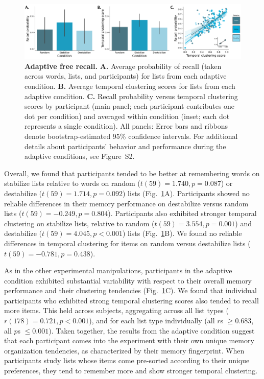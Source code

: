 \documentclass[11pt]{article}
\newcommand{\dynamicsAdaptive}{S2}
\begin{document}
\begin{figure} 
    \centering

    \includegraphics[width=\textwidth]{figures/adaptive_results}
        
        \caption{\textbf{Adaptive free recall.} \textbf{A.} Average probability
        of recall (taken across words, lists, and participants) for lists from
        each adaptive condition. \textbf{B.} Average temporal clustering scores
        for lists from each adaptive condition. \textbf{C.} Recall probability
        versus temporal clustering scores by participant (main panel; each
        participant contributes one dot per condition) and averaged within
        condition (inset; each dot represents a single condition). All panels:
        Error bars and ribbons denote bootstrap-estimated 95\% confidence
        intervals. For additional details about participants' behavior and
        performance during the adaptive conditions, see
        Figure~\dynamicsAdaptive.}

    \label{fig:adaptive}
\end{figure}

Overall, we found that participants tended to be better at remembering words on
stabilize lists relative to words on random ($t(59) = 1.740, p = 0.087$) or
destabilize ($t(59) = 1.714, p = 0.092$) lists (Fig.~\ref{fig:adaptive}A).
Participants showed no reliable differences in their memory performance on
destabilize versus random lists ($t(59) = -0.249, p = 0.804$). Participants
also exhibited stronger temporal clustering on stabilize lists, relative to
random ($t(59) = 3.554, p = 0.001$) and destabilize ($t(59) = 4.045, p <
0.001$) lists (Fig.~\ref{fig:adaptive}B). We found no reliable differences in
temporal clustering for items on random versus destabilize lists ($t(59) =
-0.781, p = 0.438$).

As in the other experimental manipulations, participants in the adaptive
condition exhibited substantial variability with respect to their overall
memory performance and their clustering tendencies (Fig.~\ref{fig:adaptive}C).
We found that individual participants who exhibited strong temporal clustering
scores also tended to recall more items. This held across subjects, aggregating
across all list types ($r(178) = 0.721, p < 0.001$), and for each list type
individually (all $r$s $\geq 0.683$, all $p$s $\leq 0.001$). Taken together,
the results from the adaptive condition suggest that each participant comes
into the experiment with their own unique memory organization tendencies, as
characterized by their memory fingerprint. When participants study lists whose
items come pre-sorted according to their unique preferences, they tend to remember
more and show stronger temporal clustering.
\end{document}
